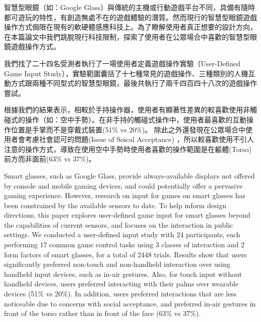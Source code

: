 \begin{abstractzh}
智慧型眼鏡（如：Google Glass）與傳統的主機或行動遊戲平台不同，具備有隨時都可遊玩的特性，有創造無處不在的遊戲體驗的潛質。然而現行的智慧型眼鏡遊戲操作方式侷限在現有的軟硬體感應科技上。為了瞭解使用者真正想要的設計方向，在本篇論文中我們跳脫現行科技限制，探索了使用者在公眾場合中喜歡的智慧型眼鏡遊戲操作方式。

我們找了二十四名受測者執行了一場使用者定義遊戲操作實驗（User-Defined Game Input Study），實驗範圍囊括了十七種常見的遊戲操作、三種類別的人機互動方式跟兩種不同型式的智慧型眼鏡，最後共執行了兩千四百四十八次的遊戲操作嘗試。

根據我們的結果表示，相較於手持操作器，使用者有顯著性差異的較喜歡使用非觸碰式的操作（如：空中手勢）。在非手持的觸碰式操作中，使用者最喜歡的互動操作位置是手掌而不是穿戴式裝置(51\% vs 20\%)。
除此之外還發現在公眾場合中使用者會考慮社會認可的問題(Issue of Soical Acceptance) ，所以較喜歡使用不引人注意的操作方式，導致在使用空中手勢時使用者喜歡的操作範圍是在軀體(Torso)前方而非面前(63\% vs 37\%)。
\end{abstractzh}

\begin{abstracten}

Smart glasses, such as Google Glass, provide always-available displays not offered by console and mobile gaming devices, and could potentially offer a pervasive gaming experience. 
However, research on input for games on smart glasses has been constrained by the available sensors to date. 
To help inform design directions, this paper explores user-defined game input for smart glasses beyond the capabilities of current sensors, and focuses on the interaction in public settings. 
We conducted a user-defined input study with 24 participants, each performing 17 common game control tasks using 3 classes of interaction and 2 form factors of smart glasses, for a total of 2448 trials. 
Results show that users significantly preferred non-touch and non-handheld interaction over using handheld input devices, such as in-air gestures. Also, for touch input without handheld devices, users preferred interacting with their palms over wearable devices (51\% vs 20\%). 
In addition, users preferred interactions that are less noticeable due to concerns with social acceptance, and preferred in-air gestures in front of the torso rather than in front of the face (63\% vs 37\%). 

\end{abstracten}

\begin{comment}
\category{K.8.0.}{General}Games; {H.5.2.}{Information Interfaces}

\terms{Design, Human factors, Performance.}

\keywords{Game; input; Control; Smart glasses; Guessability; User-defined; Public space; Pervasive gaming; Wearable.}
\end{comment}

